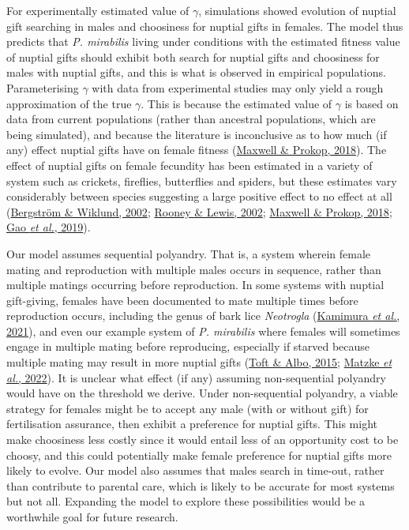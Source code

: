 \documentclass[
]{article}
\begin{document}
For experimentally estimated value of \(\gamma\), simulations showed
evolution of nuptial gift searching in males and choosiness for nuptial
gifts in females. The model thus predicts that \emph{P. mirabilis}
living under conditions with the estimated fitness value of nuptial
gifts should exhibit both search for nuptial gifts and choosiness for
males with nuptial gifts, and this is what is observed in empirical
populations. Parameterising \(\gamma\) with data from experimental
studies may only yield a rough approximation of the true \(\gamma\).
This is because the estimated value of \(\gamma\) is based on data from
current populations (rather than ancestral populations, which are being
simulated), and because the literature is inconclusive as to how much
(if any) effect nuptial gifts have on female fitness
(\protect\hyperlink{ref-Maxwell2018}{Maxwell \& Prokop, 2018}). The
effect of nuptial gifts on female fecundity has been estimated in a
variety of system such as crickets, fireflies, butterflies and spiders,
but these estimates vary considerably between species suggesting a large
positive effect to no effect at all
(\protect\hyperlink{ref-Bergstrom2002}{Bergström \& Wiklund, 2002};
\protect\hyperlink{ref-Rooney2002}{Rooney \& Lewis, 2002};
\protect\hyperlink{ref-Maxwell2018}{Maxwell \& Prokop, 2018};
\protect\hyperlink{ref-Gao2019}{Gao \emph{et al.}, 2019}).

Our model assumes sequential polyandry. That is, a system wherein female
mating and reproduction with multiple males occurs in sequence, rather
than multiple matings occurring before reproduction. In some systems
with nuptial gift-giving, females have been documented to mate multiple
times before reproduction occurs, including the genus of bark lice
\emph{Neotrogla} (\protect\hyperlink{ref-Kamimura2021}{Kamimura \emph{et
al.}, 2021}), and even our example system of \emph{P. mirabilis} where
females will sometimes engage in multiple mating before reproducing,
especially if starved because multiple mating may result in more nuptial
gifts (\protect\hyperlink{ref-Toft2015}{Toft \& Albo, 2015};
\protect\hyperlink{ref-Matzke2022}{Matzke \emph{et al.}, 2022}). It is
unclear what effect (if any) assuming non-sequential polyandry would
have on the threshold we derive. Under non-sequential polyandry, a
viable strategy for females might be to accept any male (with or without
gift) for fertilisation assurance, then exhibit a preference for nuptial
gifts. This might make choosiness less costly since it would entail less
of an opportunity cost to be choosy, and this could potentially make
female preference for nuptial gifts more likely to evolve. Our model
also assumes that males search in time-out, rather than contribute to
parental care, which is likely to be accurate for most systems but not
all. Expanding the model to explore these possibilities would be a
worthwhile goal for future research.
\end{document}
